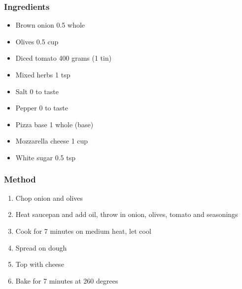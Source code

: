 \documentclass[]{article}
\begin{document}
\subsubsection*{\Large Ingredients}
\begin{multicols}{2}
\begin{itemize}
 \item Brown onion \hfill 0.5 whole
 \item Olives \hfill 0.5 cup
 \item Diced tomato \hfill 400 grams (1 tin)
 \item Mixed herbs \hfill 1 tsp
 \item Salt \hfill 0 to taste
 \item Pepper \hfill 0 to taste
 \item Pizza base \hfill 1 whole (base)
 \item Mozzarella cheese \hfill 1 cup
 \item White sugar \hfill 0.5 tsp
\end{itemize}
\end{multicols}
\subsubsection*{\Large Method}
\begin{enumerate}[font=\huge\color{accent}]
	\item Chop onion and olives
	\item Heat saucepan and add oil, throw in onion, olives, tomato and seasonings
	\item Cook for 7 minutes on medium heat, let cool
	\item Spread on dough
	\item Top with cheese
	\item Bake for 7 minutes at 260 degrees
\end{enumerate}
\newpage
{}\label{rec:Tony's Cabanossi Pizza}
\end{document}
